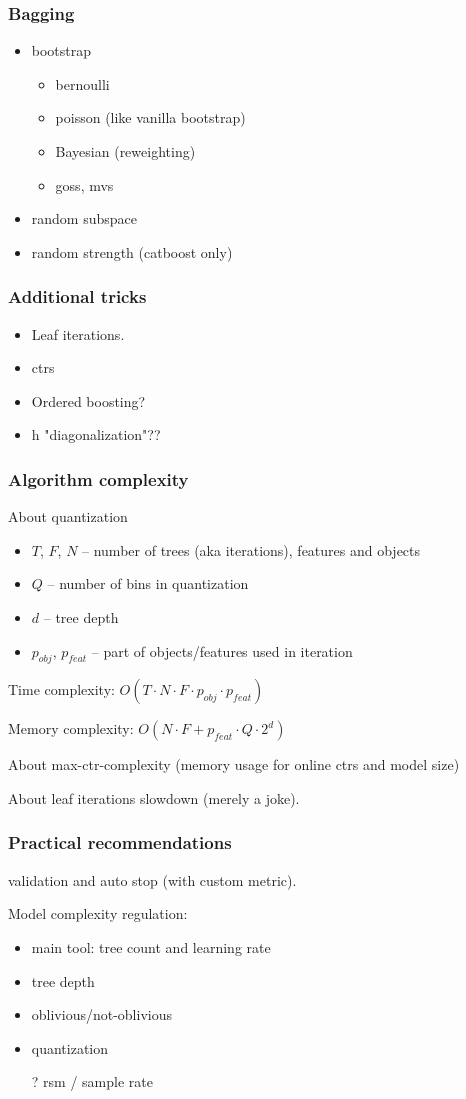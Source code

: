 \documentclass{beamer}
\begin{document}
\begin{frame}
\frametitle{Bagging}
\begin{itemize}
	\item bootstrap
	\begin{itemize}
		\item bernoulli
		\item poisson (like vanilla bootstrap)
		\item Bayesian (reweighting)
		\item goss, mvs
	\end{itemize}
	\item random subspace
	\item random strength (catboost only)
\end{itemize}
\end{frame}

\begin{frame}
\frametitle{Additional tricks}
\begin{itemize}
	\item Leaf iterations.
	\item ctrs
	\item Ordered boosting?
	\item h "diagonalization"??
\end{itemize}
\end{frame}

\begin{frame}
\frametitle{Algorithm complexity}
About quantization
\begin{itemize}
	\item $T$, $F$, $N$ -- number of trees (aka iterations), features and objects
	\item $Q$ -- number of bins in quantization
	\item $d$ -- tree depth
	\item $p_{obj}$, $p_{feat}$ -- part of objects/features used in iteration
\end{itemize}
Time complexity: $O(T\cdot N \cdot F \cdot p_{obj} \cdot p_{feat})$ \par
Memory complexity: $O(N \cdot F + p_{feat} \cdot Q \cdot 2^d)$ \par
About max-ctr-complexity (memory usage for online ctrs and model size) \par
About leaf iterations slowdown (merely a joke).
\end{frame}

\begin{frame}
\frametitle{Practical recommendations}

validation and auto stop (with custom metric). \par
Model complexity regulation:
\begin{itemize}
	\item main tool: tree count and learning rate
	\item tree depth
	\item oblivious/not-oblivious
	\item quantization
	\item[?] rsm / sample rate
\end{itemize}

\end{frame}


\begin{frame}
\frametitle{}
\end{frame}
\end{document}
